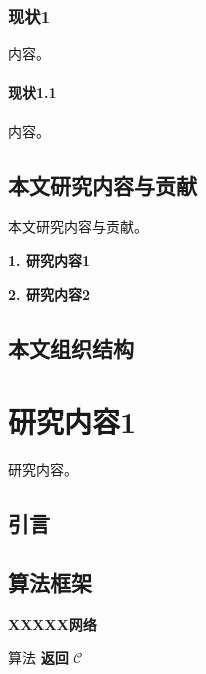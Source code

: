 \documentclass[engmaster]{thesis}
\begin{document}
\subsection{现状1}
内容。

\subsubsection{现状1.1}
内容。

\section{本文研究内容与贡献}
本文研究内容与贡献。

\textbf{1. 研究内容1}


\textbf{2. 研究内容2}



\section{本文组织结构}


\chapter{研究内容1}
研究内容。

\section{引言}


\section{算法框架}
\begin{algorithm}[!t]
    \caption{\textbf{XXXXX网络}}
    算法
    \textbf{返回} $\mathcal{C}$
\end{algorithm}
\end{document}
